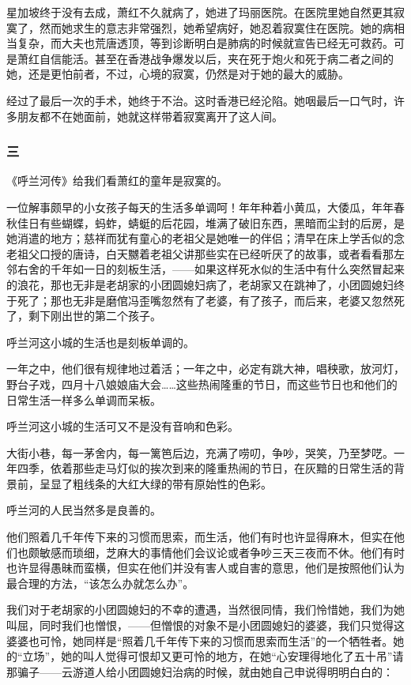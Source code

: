 \par 星加坡终于没有去成，萧红不久就病了，她进了玛丽医院。在医院里她自然更其寂寞了，然而她求生的意志非常强烈，她希望病好，她忍着寂寞住在医院。她的病相当复杂，而大夫也荒唐透顶，等到诊断明白是肺病的时候就宣告已经无可救药。可是萧红自信能活。甚至在香港战争爆发以后，夹在死于炮火和死于病二者之间的她，还是更怕前者，不过，心境的寂寞，仍然是对于她的最大的威胁。
\par 经过了最后一次的手术，她终于不治。这时香港已经沦陷。她咽最后一口气时，许多朋友都不在她面前，她就这样带着寂寞离开了这人间。
\subsubsection*{三}
\par 《呼兰河传》给我们看萧红的童年是寂寞的。
\par 一位解事颇早的小女孩子每天的生活多单调呵！年年种着小黄瓜，大倭瓜，年年春秋佳日有些蝴蝶，蚂蚱，蜻蜓的后花园，堆满了破旧东西，黑暗而尘封的后房，是她消遣的地方；慈祥而犹有童心的老祖父是她唯一的伴侣；清早在床上学舌似的念老祖父口授的唐诗，白天嬲着老祖父讲那些实在已经听厌了的故事，或者看看那左邻右舍的千年如一日的刻板生活，——如果这样死水似的生活中有什么突然冒起来的浪花，那也无非是老胡家的小团圆媳妇病了，老胡家又在跳神了，小团圆媳妇终于死了；那也无非是磨倌冯歪嘴忽然有了老婆，有了孩子，而后来，老婆又忽然死了，剩下刚出世的第二个孩子。
\par 呼兰河这小城的生活也是刻板单调的。
\par 一年之中，他们很有规律地过着活；一年之中，必定有跳大神，唱秧歌，放河灯，野台子戏，四月十八娘娘庙大会……这些热闹隆重的节日，而这些节日也和他们的日常生活一样多么单调而呆板。
\par 呼兰河这小城的生活可又不是没有音响和色彩。
\par 大街小巷，每一茅舍内，每一篱笆后边，充满了唠叨，争吵，哭笑，乃至梦呓。一年四季，依着那些走马灯似的挨次到来的隆重热闹的节日，在灰黯的日常生活的背景前，呈显了粗线条的大红大绿的带有原始性的色彩。
\par 呼兰河的人民当然多是良善的。
\par 他们照着几千年传下来的习惯而思索，而生活，他们有时也许显得麻木，但实在他们也颇敏感而琐细，芝麻大的事情他们会议论或者争吵三天三夜而不休。他们有时也许显得愚昧而蛮横，但实在他们并没有害人或自害的意思，他们是按照他们认为最合理的方法，“该怎么办就怎么办”。
\par 我们对于老胡家的小团圆媳妇的不幸的遭遇，当然很同情，我们怜惜她，我们为她叫屈，同时我们也憎恨，——但憎恨的对象不是小团圆媳妇的婆婆，我们只觉得这婆婆也可怜，她同样是“照着几千年传下来的习惯而思索而生活”的一个牺牲者。她的“立场”，她的叫人觉得可恨却又更可怜的地方，在她“心安理得地化了五十吊”请那骗子——云游道人给小团圆媳妇治病的时候，就由她自己申说得明明白白的：
